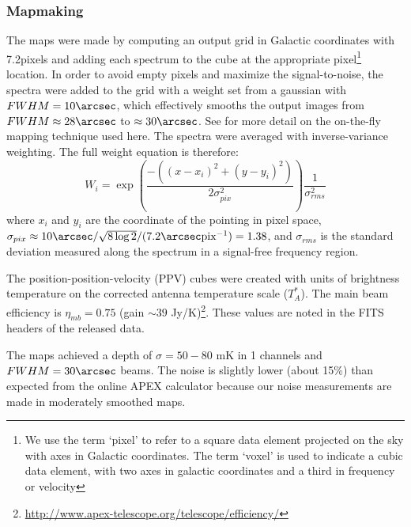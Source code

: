 \subsubsection{Mapmaking}
The maps were made by computing an output grid in Galactic coordinates with
7.2\arcsec pixels and adding each spectrum to the cube at the appropriate
pixel\footnote{We use the term `pixel' to refer to a square data element
projected on the sky with axes in Galactic coordinates.  The term `voxel' is
used to indicate a cubic data element, with two axes in galactic coordinates
and a third in frequency or velocity} location.  In order
to avoid empty pixels and maximize the signal-to-noise, the spectra were added
to the grid with a weight set from a gaussian with $FWHM=10\arcsec$, which
effectively smooths the output images from $FWHM\approx28\arcsec$ to
$\approx30\arcsec$.  See \citet{Mangum2007a} for more detail on the on-the-fly
mapping technique used here.  The spectra were averaged with inverse-variance
weighting.  The full weight equation is therefore:
\begin{equation}
    W_i = \exp\left(\frac{-\left((x-x_i)^2+(y-y_i)^2\right)}{2\sigma_{pix}^2}\right)
          \frac{1}{\sigma_{rms}^2}
\end{equation}
where $x_i$ and $y_i$ are the coordinate of the pointing in pixel space,
$\sigma_{pix}\approx10\arcsec/\sqrt{8\log{2}}/(7.2\arcsec \textrm{pix}^{-1})=1.38$,
and $\sigma_{rms}$ is the standard deviation measured along the spectrum in a
signal-free frequency region.



The position-position-velocity (PPV) cubes were created with units of
brightness temperature on the corrected antenna temperature scale ($T_A^*$).
The main beam efficiency is $\eta_{mb} = 0.75$ (gain $\sim39$
Jy/K)\footnote{\url{http://www.apex-telescope.org/telescope/efficiency/}}.
These values are noted in the FITS headers of the released data.

The maps achieved a depth of $\sigma=50-80$ mK in 1 \kms channels and
$FWHM=30\arcsec$ beams.  The noise is slightly lower (about 15\%) than expected
from the online APEX calculator because our noise measurements are made in
moderately smoothed maps.

